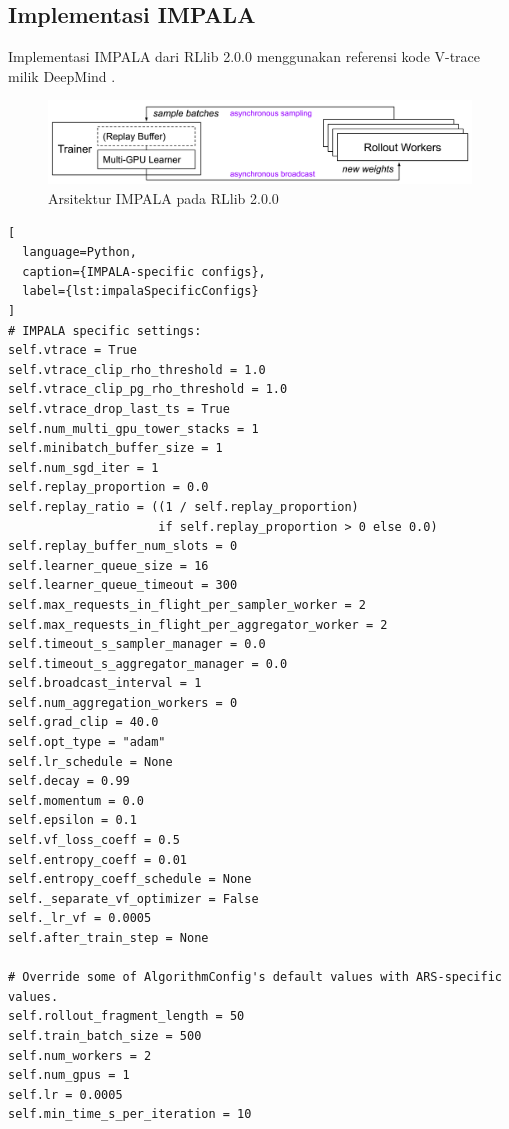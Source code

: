 \subsection{Implementasi IMPALA}
Implementasi IMPALA dari RLlib 2.0.0 menggunakan referensi kode V-trace milik DeepMind \citep{impala}.

\begin{figure}[H]
  \centering
    \includegraphics[scale=0.6]{gambar/rllib_impala_architecture.png}
    \caption{Arsitektur IMPALA pada RLlib 2.0.0 \citep{rllibDocumentation}}
    \label{fig:rllib_impala_architecture}
\end{figure}

\begin{lstlisting}[
  language=Python,
  caption={IMPALA-specific configs},
  label={lst:impalaSpecificConfigs}
]
# IMPALA specific settings:
self.vtrace = True
self.vtrace_clip_rho_threshold = 1.0
self.vtrace_clip_pg_rho_threshold = 1.0
self.vtrace_drop_last_ts = True
self.num_multi_gpu_tower_stacks = 1
self.minibatch_buffer_size = 1
self.num_sgd_iter = 1
self.replay_proportion = 0.0
self.replay_ratio = ((1 / self.replay_proportion)
                     if self.replay_proportion > 0 else 0.0)
self.replay_buffer_num_slots = 0
self.learner_queue_size = 16
self.learner_queue_timeout = 300
self.max_requests_in_flight_per_sampler_worker = 2
self.max_requests_in_flight_per_aggregator_worker = 2
self.timeout_s_sampler_manager = 0.0
self.timeout_s_aggregator_manager = 0.0
self.broadcast_interval = 1
self.num_aggregation_workers = 0
self.grad_clip = 40.0
self.opt_type = "adam"
self.lr_schedule = None
self.decay = 0.99
self.momentum = 0.0
self.epsilon = 0.1
self.vf_loss_coeff = 0.5
self.entropy_coeff = 0.01
self.entropy_coeff_schedule = None
self._separate_vf_optimizer = False
self._lr_vf = 0.0005
self.after_train_step = None

# Override some of AlgorithmConfig's default values with ARS-specific values.
self.rollout_fragment_length = 50
self.train_batch_size = 500
self.num_workers = 2
self.num_gpus = 1
self.lr = 0.0005
self.min_time_s_per_iteration = 10
    
\end{lstlisting}